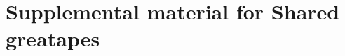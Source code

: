 \appendix
\renewcommand\thefigure{\thechapter.\arabic{figure}}
\renewcommand\thetable{\thechapter.\arabic{table}}
\captionsetup{list=no}

\chapter{Supplemental material for Shared greatapes}



